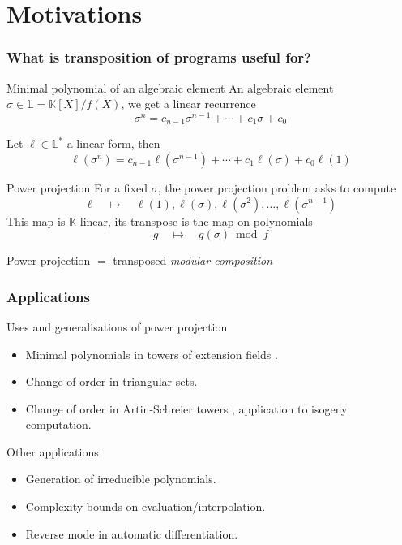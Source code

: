 \documentclass[10pt]{beamer}
\newcommand{\K}{\mathbb{K}}
\newcommand{\LK}{\mathbb{L}}
\begin{document}

\section{Motivations}

\begin{frame}
  \frametitle{What is transposition of programs useful for?}
  
  \vspace{-1ex}

  \begin{block}{Minimal polynomial of an algebraic element \cite{Sho95}}
    An algebraic element $\sigma\in\LK=\K[X]/f(X)$, we get a linear
    recurrence
    \[ \sigma^n = c_{n-1} \sigma^{n-1} + \cdots + c_1\sigma + c_0\]

    Let $\ell\in\LK^\ast$ a linear form, then
    \[ \ell(\sigma^n) = c_{n-1} \ell(\sigma^{n-1}) + \cdots +
    c_1\ell(\sigma) + c_0\ell(1)\]
  \end{block}

  \vspace{-1ex}

  \begin{block}{Power projection}
    For a fixed $\sigma$, the power projection problem asks to
    compute
    \[\ell \quad\mapsto\quad \ell(1), \ell(\sigma), \ell(\sigma^2), \ldots, \ell(\sigma^{n-1})\]
    This map is $\K$-linear, its transpose is the map on polynomials
    \[g \quad\mapsto\quad g(\sigma) \bmod f\]

    \begin{center}
      \large \alert{Power projection $=$ transposed \emph{modular
          composition}}
    \end{center}
  \end{block}
\end{frame}


\begin{frame}
  \frametitle{Applications}

  \begin{block}{Uses and generalisations of power projection}
    \begin{itemize}
    \item Minimal polynomials in towers of extension fields \cite{Sho95}.
    \item Change of order in triangular sets.
    \item Change of order in Artin-Schreier towers \cite{DFS09},
      application to isogeny computation.
    \end{itemize}
  \end{block}

  \begin{block}{Other applications}
    \begin{itemize}
    \item Generation of irreducible polynomials.
    \item Complexity bounds on evaluation/interpolation.
    \item Reverse mode in automatic differentiation.
    \end{itemize}
  \end{block}
\end{frame}
\end{document}
